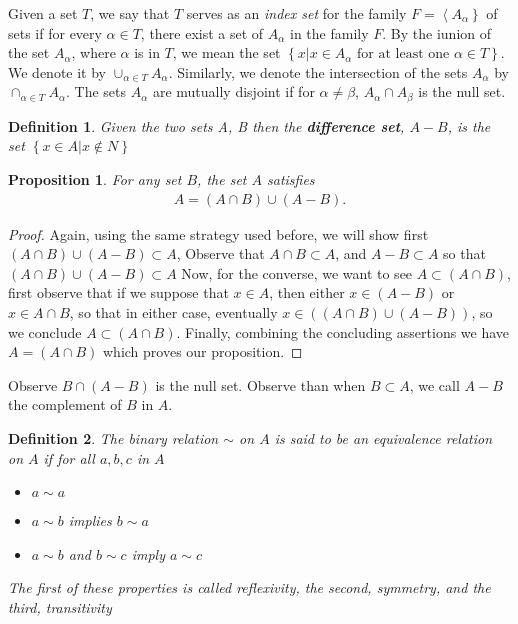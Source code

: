 \documentclass[11pt,a4paper]{article}
\newtheorem{define}{Definition}
\newtheorem{claim}{Proposition}
\begin{document}
Given a set $T$, we say that $T$ serves as an \emph{index set} for the family $F = \left\langle A_{\alpha} \right\rbrace $ of sets if for every $ \alpha \in T$, there exist a set of $A_\alpha$ in the family $F$.
By the iunion of the set $A_\alpha$, where $\alpha$ is in $T$, we mean the set $ \left\lbrace x \vert x \in A_\alpha \text{ for  at least one } \alpha \in T \right\rbrace$. We denote it by $ \cup_{\alpha \in T} A_{\alpha} $. Similarly, we denote the intersection of the sets $A_\alpha$ by $ \cap_{\alpha \in T} A_{\alpha} $. The sets $A_\alpha$ are mutually disjoint if for $ \alpha \neq \beta$, $ A_\alpha \cap A_\beta $ is the null set.
\begin{define}
Given the two sets A, B then the 
\textbf{difference set}, $A - B$, is the set $ \left\lbrace x \in A \vert x \not\in N \right\rbrace$
\end{define}
\begin{claim}
For any set $B$, the set $A$ satisfies  
\begin{align*}
A = ( A \cap B) \cup (A - B). 
\end{align*}
\end{claim}
\begin{proof}
Again, using the same strategy used before, we will show first $ (A \cap B) \cup (A - B) \subset A $, Observe that $A \cap B \subset A$, and $ A - B \subset A$ so that $ ( A \cap B ) \cup ( A - B ) \subset A $
Now, for the converse, we want to see $ A  \subset (A \cap B)$, first observe that if we suppose that $x \in A$, then either $ x \in (A-B)$ or $x \in A \cap B$, so that in either case, eventually $x \in ((A \cap B) \cup (A - B) )$, so we conclude $ A  \subset (A \cap B) $. Finally, combining the concluding assertions we have $ A = (A \cap B) $ which proves our proposition.
\end{proof}

Observe $B \cap (A - B) $ is the null set. Observe than when $ B \subset A $, we call $A-B$ the complement of $B$ in $A$.

\begin{define}
	The binary relation $ \sim $ on $ A $ is said to be an \emph{equivalence relation} on $A$ if for all $a,b,c$ in $A$
	\begin{itemize}
		\item $a \sim a$ 
		\item $a \sim b $ implies $ b \sim a $ 
		\item $ a \sim b $ and $ b \sim c$ imply $a \sim c$
	\end{itemize}
	The first of these properties is called reflexivity, the second, symmetry, and the third, transitivity
\end{define}
\end{document}

